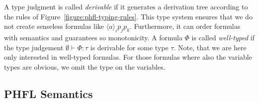 A type judgment is called \textit{derivable} if it generates a derivation tree according to the rules of
Figure~\ref{figure:phfl-typing-rules}. This type system ensures that we do not create senseless formulas like
$\langle a \rangle_i p_j p_k$. Furthermore, it can order formulas with semantics and guarantees so monotonicity. A
formula $\Phi$ is called \textit{well-typed} if the type judgement $\emptyset \vdash \Phi:\tau$ is derivable for some
type $\tau$. Note, that we are here only interested in well-typed formulas. For those formulas where also the variable
types are obvious, we omit the type on the variables.

\subsection{PHFL Semantics}\label{subsec:phflSemantics}


